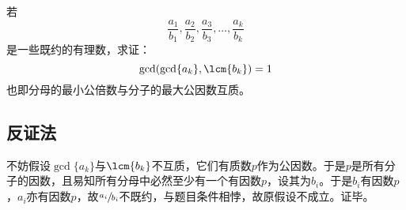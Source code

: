 

若
\[ \frac{a_1}{b_1}, \frac{a_2}{b_2}, \frac{a_3}{b_3}, \dots, \frac{a_k}{b_k} \]
是一些既约的有理数，求证：
\[ \gcd(\gcd\{a_k\}, \lcm\{b_k\}) = 1 \]
也即分母的最小公倍数与分子的最大公因数互质。

\subsection{反证法}

不妨假设$\gcd\{a_k\}$与$\lcm\{b_k\}$不互质，它们有质数$p$作为公因数。于是$p$是所有分子的因数，且易知所有分母中必然至少有一个有因数$p$，设其为$b_i$。于是$b_i$有因数$p$，$a_i$亦有因数$p$，故$\sfrac{a_i}{b_i}$不既约，与题目条件相悖，故原假设不成立。证毕。

